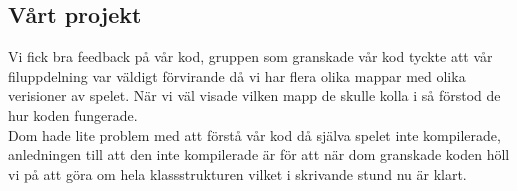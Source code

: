 \documentclass{TDP003mall}
\begin{document}
\subsection{Vårt projekt}
Vi fick bra feedback på vår kod, gruppen som granskade vår kod tyckte att vår filuppdelning var väldigt förvirande då vi har flera olika mappar med olika verisioner av spelet. När vi väl visade vilken mapp de skulle kolla i så förstod de hur koden fungerade. \\
Dom hade lite problem med att förstå vår kod då själva spelet inte kompilerade, anledningen till att den inte kompilerade är för att när dom granskade koden höll vi på att göra om hela klassstrukturen vilket i skrivande stund nu är klart.
\end{document}
